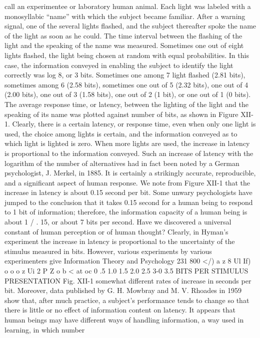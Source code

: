 {{{{{{{{{{{call an experimentee or laboratory human animal. Each light was
labeled with a monosyllabic “name” with which the subject became
familiar. After a warning signal, one of the several lights flashed,
and the subject thereafter spoke the name of the light as soon as
he could. The time interval between the flashing of the light and
the speaking of the name was measured.
Sometimes one out of eight lights flashed, the light being chosen
at random with equal probabilities. In this case, the information
conveyed in enabling the subject to identify the light correctly was
log 8, or 3 bits. Sometimes one among 7 light flashed (2.81 bits),
sometimes among 6 (2.58 bits), sometimes one out of 5 (2.32 bits),
one out of 4 (2.00 bits), one out of 3 (1.58 bits), one out of 2 (1 bit),
or one out of 1 (0 bits). The average response time, or latency,
between the lighting of the light and the speaking of its name was
plotted against number of bits, as shown in Figure XII-1.
Clearly, there is a certain latency, or response time, even when
only one light is used, the choice among lights is certain, and the
information conveyed as to which light is lighted is zero. When
more lights are used, the increase in latency is proportional to the
information conveyed. Such an increase of latency with the logarithm
of the number of alternatives had in fact been noted by a
German psychologist, J. Merkel, in 1885. It is certainly a strikingly
accurate, reproducible, and a significant aspect of human response.
We note from Figure XII-1 that the increase in latency is about
0.15 second per bit. Some unwary psychologists have jumped to
the conclusion that it takes 0.15 second for a human being to
respond to 1 bit of information; therefore, the information capacity
of a human being is about 1 / . 15, or about 7 bits per second. Have
we discovered a universal constant of human perception or of
human thought?
Clearly, in Hyman’s experiment the increase in latency is proportional
to the uncertainty of the stimulus measured in bits.
However, various experiments by various experimenters give
Information Theory and Psychology 231
800
</) a
z
8 Ul If)
o
o
o
z
Ui
2
P
Z
o
b <
at
oc
0 .5 1.0 1.5 2.0 2.5 3-0 3.5
BITS PER STIMULUS PRESENTATION
Fig. XII-1
somewhat different rates of increase in seconds per bit. Moreover,
data published by G. H. Mowbray and M. V. Rhoades in 1959
show that, after much practice, a subject’s performance tends to
change so that there is little or no effect of information content
on latency. It appears that human beings may have different ways
of handling information, a way used in learning, in which number
}}}}}}}}}}}
